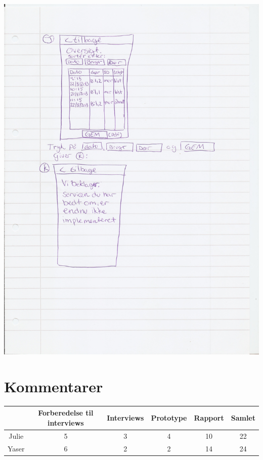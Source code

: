 \documentclass[a4paper,12pt]{article}
\begin{document}
\includegraphics[width=\textwidth]{proto/JK.jpg}

\section{Kommentarer}
\begin{tabular}{|c|c|c|c|c|c|}
	\hline & Forberedelse til interviews & Interviews & Prototype & Rapport & Samlet \\
	\hline Julie & 5 & 3 & 4 & 10 & 22 \\
	\hline Yaser & 6 & 2 & 2 & 14 & 24 \\
	\hline
\end{tabular}
\end{document}
